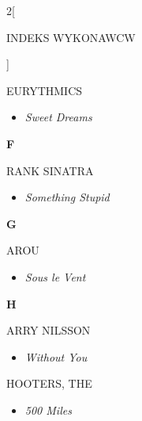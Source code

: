 \documentclass[a4paper]{report}
\begin{document}
\begin{multicols*}{2}[\begin{Huge}INDEKS WYKONAWCW\end{Huge}\vspace{1cm}]
\begin{minipage}{\columnwidth}
	EURYTHMICS 
	\begin{itemize}[topsep=3pt, after=\vspace{3mm}]
		\itemsep0em
		\item[]\textit{Sweet Dreams}  \\
	\end{itemize}
\end{minipage}
\begin{minipage}{\columnwidth}
	\begin{Large}\textbf{F}\end{Large}RANK SINATRA 
	\begin{itemize}[topsep=3pt, after=\vspace{3mm}]
		\itemsep0em
		\item[]\textit{Something Stupid}  \\
	\end{itemize}
\end{minipage}
\begin{minipage}{\columnwidth}
	\begin{Large}\textbf{G}\end{Large}AROU 
	\begin{itemize}[topsep=3pt, after=\vspace{3mm}]
		\itemsep0em
		\item[]\textit{Sous le Vent}  \\
	\end{itemize}
\end{minipage}
\begin{minipage}{\columnwidth}
	\begin{Large}\textbf{H}\end{Large}ARRY NILSSON 
	\begin{itemize}[topsep=3pt, after=\vspace{3mm}]
		\itemsep0em
		\item[]\textit{Without You}  \\
	\end{itemize}
\end{minipage}
\begin{minipage}{\columnwidth}
	HOOTERS, THE 
	\begin{itemize}[topsep=3pt, after=\vspace{3mm}]
		\itemsep0em
		\item[]\textit{500 Miles}  \\
	\end{itemize}
\end{minipage}
\begin{minipage}{\columnwidth}

\end{minipage}
\end{multicols*}
\end{document}
